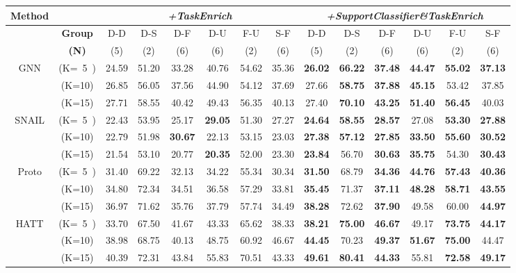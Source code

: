 \begin{table*}[th]
\begin{tabular}{|c|c|cccccc|cccccc|}
\textbf{Method} & & \multicolumn{6}{c|}{\emph{+TaskEnrich}} &\multicolumn{6}{c|}{\emph{+SupportClassifier\&TaskEnrich}} \\ \hline
& \textbf{Group} & D-D & D-S & D-F & D-U & F-U & S-F& D-D & D-S & D-F & D-U & F-U & S-F\\
& \textbf{(N)} & (5) & (2) & (6) & (6)& (2) & (6)& (5) & (2) & (6) & (6)& (2) & (6)\\ \hline
\multirow{3}{*}{GNN}
 & (K=~5~) & 24.59&\textcolor[rgb]{0.45,0.45,0.45}{51.20}&\textcolor[rgb]{0.45,0.45,0.45}{33.28}&40.76&54.62&35.36 &\textbf{26.02}&\textbf{66.22}&\textbf{37.48}&\textbf{44.47}&\textbf{55.02}&\textbf{37.13} \\
 & (K=10) &26.85&56.05&37.56&44.90&\textcolor[rgb]{0.45,0.45,0.45}{54.12}&37.69 &27.66&\textbf{58.75}&\textbf{37.88}&\textbf{45.15}&\textcolor[rgb]{0.45,0.45,0.45}{53.42}&37.85 \\
 & (K=15) &27.71&58.55&40.42&49.43&56.35&40.13 &27.40&\textbf{70.10}&\textbf{43.25}&\textbf{51.40}&\textbf{56.45}&40.03 \\ \hline
\multirow{3}{*}{SNAIL}
 & (K=~5~) &22.43&53.95&25.17&\textbf{29.05}&51.30&27.27&\textbf{24.64}&\textbf{58.55}&\textbf{28.57}&27.08&\textbf{53.30}&\textbf{27.88} \\
 & (K=10) &22.79&\textcolor[rgb]{0.45,0.45,0.45}{51.98}&\textbf{30.67}&\textcolor[rgb]{0.45,0.45,0.45}{22.13}&53.15&23.03         &\textbf{27.38}&\textbf{57.12}&\textbf{27.85}&\textbf{33.50}&\textbf{55.60}&\textbf{30.52} \\
 & (K=15) &\textcolor[rgb]{0.45,0.45,0.45}{21.54}&53.10&20.77&\textbf{20.35}&52.00&23.30     &\textbf{23.84}& 56.70&\textbf{30.63}&\textbf{35.75}&54.30&\textbf{30.43} \\ \hline

\multirow{3}{*}{Proto}
 & (K=~5~) &31.40 &69.22 &32.13& 34.22&55.34&30.34&\textbf{31.50} &68.79 &\textbf{34.36} & \textbf{44.76} &\textbf{57.43}&\textbf{40.36} \\ 
 & (K=10) &34.80 &72.34 &34.51&36.58&57.29&33.81&\textbf{35.45} &71.37 &\textbf{37.11} & \textbf{48.28}&\textbf{58.71}&\textbf{43.55} \\
 & (K=15) &36.97 &71.62 &35.76 &37.79 &57.74&34.49&\textbf{38.28} &72.62 &\textbf{37.90} &49.58 &60.00&\textbf{44.97} \\ \hline

\multirow{3}{*}{HATT}
 & (K=~5~) &33.70&67.50&41.67&43.33&65.62&\textcolor[rgb]{0.45,0.45,0.45}{38.33} &\textbf{38.21}&\textbf{75.00}&\textbf{46.67}&49.17&\textbf{73.75}&\textbf{44.17} \\
 & (K=10) &38.98&68.75&40.13&48.75&\textcolor[rgb]{0.45,0.45,0.45}{60.92}&46.67  %
&\textbf{44.45}&70.23&\textbf{49.37}&\textbf{51.67}&\textbf{75.00}&44.47 \\
 & (K=15) &40.39&72.31&43.84&\textcolor[rgb]{0.45,0.45,0.45}{55.83}&70.51&43.33  %
&\textbf{49.61}&\textbf{80.41}&\textbf{44.33}&\textcolor[rgb]{0.45,0.45,0.45}{55.81}&\textbf{72.58}&\textbf{49.17} \\ \hline


\end{tabular}
\end{table*}
